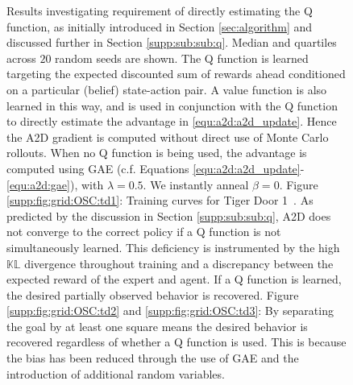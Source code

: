 \begin{figure}[t]
    \caption{Results investigating requirement of directly estimating the Q function, as initially introduced in Section \ref{sec:algorithm} and discussed further in Section \ref{supp:sub:sub:q}.  Median and quartiles across $20$ random seeds are shown.  The Q function is learned targeting the expected discounted sum of rewards ahead conditioned on a particular (belief) state-action pair.  A value function is also learned in this way, and is used in conjunction with the Q function to directly estimate the advantage in \eqref{equ:a2d:a2d_update}.  Hence the A2D gradient is computed without direct use of Monte Carlo rollouts.  When no Q function is being used, the advantage is computed using GAE (c.f. Equations \eqref{equ:a2d:a2d_update}-\eqref{equ:a2d:gae}), with $\lambda = 0.5$.  We instantly anneal $\beta = 0$.  { }%
    Figure \ref{supp:fig:grid:OSC:td1}: Training curves for Tiger Door 1~\citep{littman1995pomdp}.  As predicted by the discussion in Section \ref{supp:sub:sub:q}, A2D does not converge to the correct policy if a Q function is not simultaneously learned.  This deficiency is instrumented by the high $\mathbb{KL}$ divergence throughout training and a discrepancy between the expected reward of the expert and agent.  If a Q function is learned, the desired partially observed behavior is recovered.   { }%
    Figure \ref{supp:fig:grid:OSC:td2} and \ref{supp:fig:grid:OSC:td3}: By separating the goal by at least one square means the desired behavior is recovered regardless of whether a Q function is used.  This is because the bias has been reduced through the use of GAE and the introduction of additional random variables.  { }%
    }
    \label{supp:fig:grid:OSC}
\end{figure}